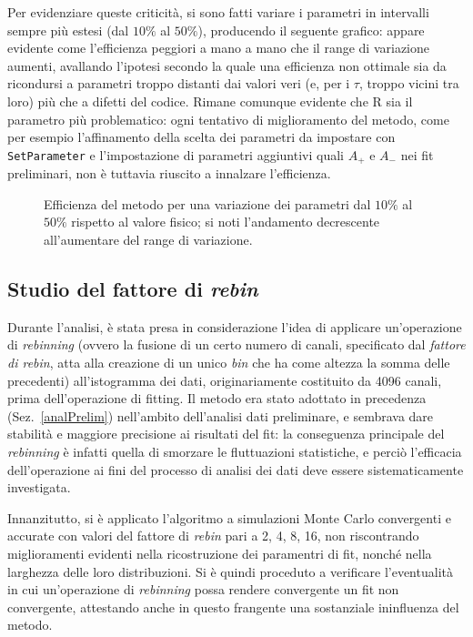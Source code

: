 \documentclass[10pt, oneside, a4paper]{article}   	%
\begin{document}
Per evidenziare queste criticità, si sono fatti variare i parametri in intervalli sempre più estesi (dal $10\%$ al $50\%$), producendo il seguente grafico: appare evidente come l'efficienza peggiori a mano a mano che il range di variazione aumenti, avallando l'ipotesi secondo la quale una efficienza non ottimale sia da ricondursi a parametri troppo distanti dai valori veri (e, per i $\tau$, troppo vicini tra loro) più che a difetti del codice. Rimane comunque evidente che R sia il parametro più problematico: ogni tentativo di miglioramento del metodo, come per esempio l'affinamento della scelta dei parametri da impostare con \lstinline{SetParameter} e l'impostazione di parametri aggiuntivi quali $A_+$ e $A_-$ nei fit preliminari, non è tuttavia riuscito a innalzare l'efficienza.
%
\begin{figure}[H]
  \centering
  
  \caption{Efficienza del metodo per una variazione dei parametri dal $10 \%$ al $50\%$ rispetto al valore fisico; si noti l'andamento decrescente all'aumentare del range di variazione.}
  \label{fig:finale}
\end{figure}
%
%
\subsection{Studio del fattore di \emph{rebin}} \label{parrebin}
Durante l'analisi, è stata presa in considerazione l'idea di applicare un'operazione di \textit{rebinning} (ovvero la fusione di un certo numero di canali, specificato dal \textit{fattore di rebin}, atta alla creazione di un unico \emph{bin} che ha come altezza la somma delle precedenti) all'istogramma dei dati, originariamente costituito da 4096 canali, prima dell'operazione di fitting. Il metodo era stato adottato in precedenza (Sez.~\cref{analPrelim}) nell'ambito dell'analisi dati preliminare, e sembrava dare stabilità e maggiore precisione ai risultati del fit: la conseguenza principale del \textit{rebinning} è infatti quella di smorzare le fluttuazioni statistiche, e perciò l'efficacia dell'operazione ai fini del processo di analisi dei dati deve essere sistematicamente investigata.

Innanzitutto, si è applicato l'algoritmo a simulazioni Monte Carlo convergenti e accurate con valori del fattore di \emph{rebin} pari a 2, 4, 8, 16, non riscontrando miglioramenti evidenti nella ricostruzione dei paramentri di fit, nonché nella larghezza delle loro distribuzioni. Si è quindi proceduto a verificare l'eventualità in cui un'operazione di \textit{rebinning} possa rendere convergente un fit non convergente, attestando anche in questo frangente una sostanziale ininfluenza del metodo.
\end{document}

